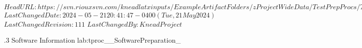 \svnidlong
{$HeadURL: https://svn.riouxsvn.com/kneadlatxinputs/ExampleArtifactFolders/zProjectWideData/TestPrepProcs/TestPrep_SoftwareInformation.tex $}
{$LastChangedDate: 2024-05-21 20:41:47 -0400 (Tue, 21 May 2024) $}
{$LastChangedRevision: 111 $}
{$LastChangedBy: KneadProject $}

\TestProcedure  %
{\TestProcNumber.3}
{\StdTestNameX Software Information}
{lab:tproc_\StdTestName_SoftwarePreparation_\TestProcNumber}
{
}
{
}
{
}
